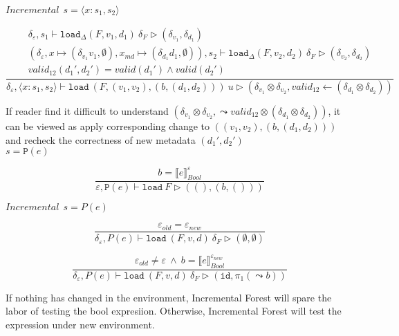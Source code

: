 \documentclass[10pt,twoside,a4paper]{article}
\theoremstyle{theorem}
\theoremstyle{lemma}
\theoremstyle{property}
\theoremstyle{definition}
\theoremstyle{assumption}
\def\fst{\pi_1}
\begin{document}
$\boxed{Incremental~~s = \langle x : s_1, s_2 \rangle}$

\begin{displaymath}
	\frac{\begin{array}{c}
		\delta_\varepsilon, s_1 \vdash \mathtt{load}_\Delta (F,v_1,d_1)~ \delta_F \rhd (\delta_{v_1},\delta_{d_1})\\
		(\delta_\varepsilon, x \mapsto (\delta_{v_1} v_1, \emptyset), x_{md} \mapsto (\delta_{d_1} d_1, \emptyset)), s_2 \vdash \mathtt{load}_\Delta (F,v_2,d_2)~ \delta_F \rhd (\delta_{v_2},\delta_{d_2})\\
		valid_{12}({d_1}',{d_2}') = valid({d_1}') \wedge valid({d_2}')
	\end{array}}
	{\delta_\varepsilon, \langle x:s_1,s_2 \rangle \vdash \mathtt{load}~ (F,(v_1,v_2),(b,(d_1,d_2)))~ u \rhd (\delta_{v_1} \otimes \delta_{v_2},valid_{12} \leftarrow (\delta_{d_1} \otimes \delta_{d_2})) }
\end{displaymath}

If reader find it difficult to understand $(\delta_{v_1} \otimes \delta_{v_2},\leadsto valid_{12} \otimes (\delta_{d_1} \otimes \delta_{d_2}))$, it can be viewed as apply corresponding change to $((v_1,v_2),(b,(d_1,d_2)))$ and recheck the correctness of new metadata $({d_1}', {d_2}')$\\

$\boxed{s = \mathtt{P}(e)}$

\begin{displaymath}
	\frac
	{b = \llbracket e \rrbracket^{\varepsilon}_{Bool}}
	{\varepsilon, \mathtt{P}(e) \vdash \mathtt{load}~F \rhd ((),(b,()))}
\end{displaymath}

$\boxed{Incremental~~s = P(e)}$

\begin{displaymath}
	\frac{ \varepsilon_{old} = \varepsilon_{new}}
	{\delta_\varepsilon, P(e) \vdash \mathtt{load}~ (F,v,d) ~\delta_F \rhd (\emptyset, \emptyset)}
\end{displaymath}

\begin{displaymath}
	\frac{ \varepsilon_{old} \not= \varepsilon ~\wedge~  b = \llbracket e \rrbracket^{\varepsilon_{new}}_{Bool}}
	{\delta_\varepsilon, P(e) \vdash \mathtt{load}~ (F,v,d) ~\delta_F \rhd (\mathtt{id},\fst(\leadsto b))}
\end{displaymath}

If nothing has changed in the environment, Incremental Forest will spare the labor of testing the bool expresiion. Otherwise, Incremental Forest will test the expression under new environment.\\
\end{document}

